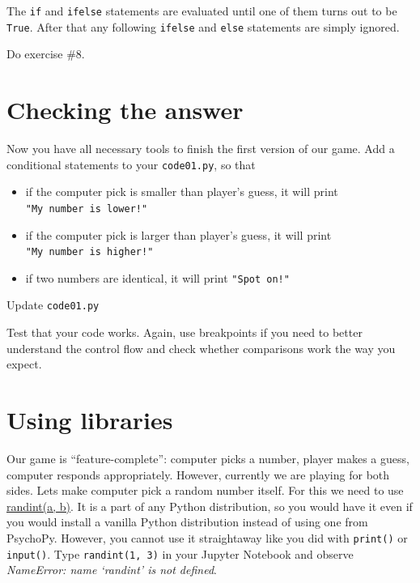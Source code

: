 \documentclass[
]{book}
\providecommand{\tightlist}{%
  \setlength{\itemsep}{0pt}\setlength{\parskip}{0pt}}
\begin{document}
The \texttt{if} and \texttt{ifelse} statements are evaluated until one of them turns out to be \texttt{True}. After that any following \texttt{ifelse} and \texttt{else} statements are simply ignored.

Do exercise \#8.

\hypertarget{checking-the-answer}{%
\section{Checking the answer}\label{checking-the-answer}}

Now you have all necessary tools to finish the first version of our game. Add a conditional statements to your \texttt{code01.py}, so that

\begin{itemize}
\tightlist
\item
  if the computer pick is smaller than player's guess, it will print \texttt{"My\ number\ is\ lower!"}
\item
  if the computer pick is larger than player's guess, it will print \texttt{"My\ number\ is\ higher!"}
\item
  if two numbers are identical, it will print \texttt{"Spot\ on!"}
\end{itemize}

Update \texttt{code01.py}

Test that your code works. Again, use breakpoints if you need to better understand the control flow and check whether comparisons work the way you expect.

\hypertarget{using-libraries}{%
\section{Using libraries}\label{using-libraries}}

Our game is ``feature-complete'': computer picks a number, player makes a guess, computer responds appropriately. However, currently we are playing for both sides. Lets make computer pick a random number itself. For this we need to use \href{https://docs.python.org/3/library/random.html\#random.randint}{randint(a, b)}. It is a part of any Python distribution, so you would have it even if you would install a vanilla Python distribution instead of using one from PsychoPy. However, you cannot use it straightaway like you did with \texttt{print()} or \texttt{input()}. Type \texttt{randint(1,\ 3)} in your Jupyter Notebook and observe \emph{NameError: name `randint' is not defined}.
\end{document}

